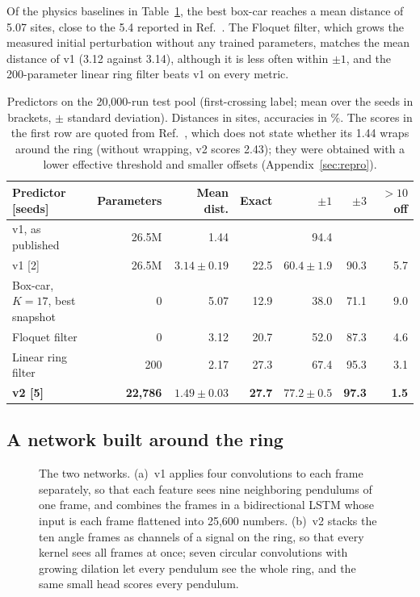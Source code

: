 \documentclass[11pt]{article}
\begin{document}
Of the physics baselines in Table~\ref{tab:headline}, the best box-car reaches a mean distance of 5.07 sites, close to the 5.4 reported in Ref.~\cite{mittal2026jand}. The Floquet filter, which grows the measured initial perturbation without any trained parameters, matches the mean distance of v1 (3.12 against 3.14), although it is less often within $\pm1$, and the 200-parameter linear ring filter beats v1 on every metric.

\begin{table}[t]
  \centering
  \caption{Predictors on the 20,000-run test pool (first-crossing label; mean over the seeds in brackets, $\pm$ standard deviation). Distances in sites, accuracies in \%. The scores in the first row are quoted from Ref.~\cite{mittal2026jand}, which does not state whether its 1.44 wraps around the ring (without wrapping, v2 scores 2.43); they were obtained with a lower effective threshold and smaller offsets (Appendix~\ref{sec:repro}).}
  \label{tab:headline}
  \small
  \setlength{\tabcolsep}{4pt}
  \begin{tabular}{@{}lrrrrrr@{}}
    \toprule
    Predictor [seeds] & Parameters & Mean dist. & Exact & $\pm1$ & $\pm3$ & $>10$ off \\
    \midrule
    v1, as published \cite{mittal2026jand} & 26.5M & 1.44 & & 94.4 & & \\
    v1 [2] & 26.5M & $3.14\pm0.19$ & 22.5 & $60.4\pm1.9$ & 90.3 & 5.7 \\
    Box-car, $K=17$, best snapshot & 0 & 5.07 & 12.9 & 38.0 & 71.1 & 9.0 \\
    Floquet filter & 0 & 3.12 & 20.7 & 52.0 & 87.3 & 4.6 \\
    Linear ring filter & 200 & 2.17 & 27.3 & 67.4 & 95.3 & 3.1 \\
    \textbf{v2 [5]} & \textbf{22,786} & $\mathbf{1.49\pm0.03}$ & \textbf{27.7} & $\mathbf{77.2\pm0.5}$ & \textbf{97.3} & \textbf{1.5} \\
    \bottomrule
  \end{tabular}
\end{table}

\subsection{A network built around the ring}
\label{sec:arch}

\begin{figure}[t]
  \centering
  
  \caption{The two networks. (a)~v1 applies four convolutions to each frame separately, so that each feature sees nine neighboring pendulums of one frame, and combines the frames in a bidirectional LSTM whose input is each frame flattened into 25,600 numbers. (b)~v2 stacks the ten angle frames as channels of a signal on the ring, so that every kernel sees all frames at once; seven circular convolutions with growing dilation let every pendulum see the whole ring, and the same small head scores every pendulum.}
  \label{fig:schematic}
\end{figure}
\end{document}
